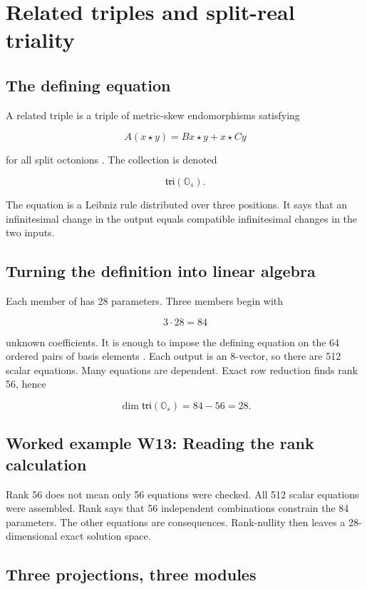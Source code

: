 \documentclass[11pt]{article}
\begin{document}
\section{Related triples and split-real triality}

\subsection{The defining equation}

A related triple is a triple of metric-skew endomorphisms \texttt{} satisfying

\[
A(x\star y)=Bx\star y+x\star Cy
\]

for all split octonions \texttt{}. The collection is denoted

\[
\mathfrak{tri}(\mathbb O_s).
\]

The equation is a Leibniz rule distributed over three positions. It says that an infinitesimal change in the output equals compatible infinitesimal changes in the two inputs.

\subsection{Turning the definition into linear algebra}

Each member of \texttt{} has 28 parameters. Three members begin with

\[
3\cdot28=84
\]

unknown coefficients. It is enough to impose the defining equation on the 64 ordered pairs of basis elements \texttt{}. Each output is an 8-vector, so there are 512 scalar equations. Many equations are dependent. Exact row reduction finds rank 56, hence

\[
\dim\mathfrak{tri}(\mathbb O_s)=84-56=28.
\]

\subsection{Worked example W13: Reading the rank calculation}

Rank 56 does not mean only 56 equations were checked. All 512 scalar equations were assembled. Rank says that 56 independent combinations constrain the 84 parameters. The other equations are consequences. Rank-nullity then leaves a 28-dimensional exact solution space.

\subsection{Three projections, three modules}
\end{document}
